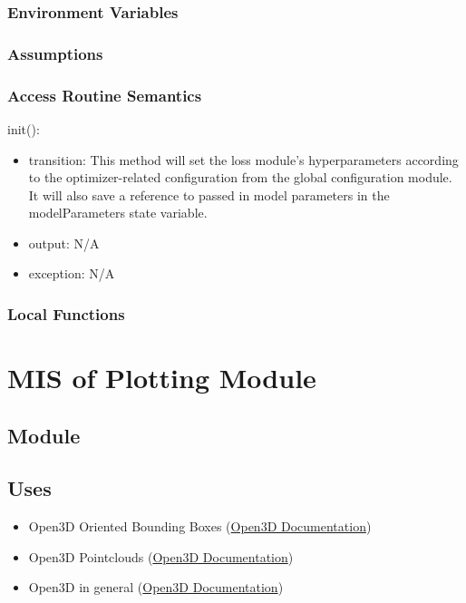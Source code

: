 \documentclass[12pt, titlepage]{article}
\begin{document}
\subsubsection{Environment Variables}



\subsubsection{Assumptions}



\subsubsection{Access Routine Semantics}
\noindent init():
\begin{itemize}
\item transition: This method will set the loss module's hyperparameters according to the optimizer-related configuration from the global configuration module. It will also save a reference to passed in model parameters in the modelParameters state variable.
\item output: N/A
\item exception: N/A
\end{itemize}

\subsubsection{Local Functions}

\newpage

\section{MIS of Plotting Module} \label{Module} 

\subsection{Module}



\subsection{Uses}
\begin{itemize}
  \item Open3D Oriented Bounding Boxes (\href{https://www.open3d.org/docs/latest/python_api/open3d.geometry.OrientedBoundingBox.html}{Open3D Documentation})
  \item Open3D Pointclouds (\href{https://www.open3d.org/docs/release/python_api/open3d.geometry.PointCloud.html}{Open3D Documentation})
  \item Open3D in general (\href{https://www.open3d.org/docs/release/introduction.html}{Open3D Documentation})
\end{itemize}
\end{document}
